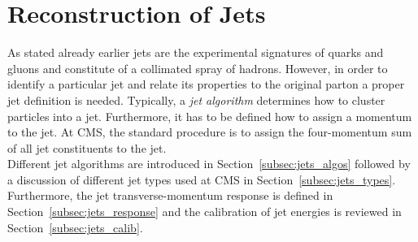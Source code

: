 \section{Reconstruction of Jets}
\label{sec:jets_reco}
As stated already earlier jets are the experimental signatures of quarks and gluons and constitute of a collimated spray of hadrons. However, in order to identify a particular jet and relate its properties to the original parton a proper jet definition is needed. Typically, a \textit{jet algorithm} determines how to cluster particles into a jet. Furthermore, it has to be defined how to assign a momentum to the jet. At CMS, the standard procedure is to assign the four-momentum sum of all jet constituents to the jet. \\
Different jet algorithms are introduced in Section~\ref{subsec:jets_algos} followed by a discussion of different jet types used at CMS in Section~\ref{subsec:jets_types}. Furthermore, the jet transverse-momentum response is defined in Section~\ref{subsec:jets_response} and the calibration of jet energies is reviewed in Section~\ref{subsec:jets_calib}.
